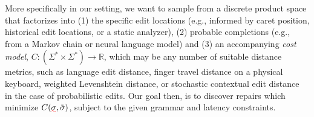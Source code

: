 \documentclass[sigplan,review,anonymous,acmsmall]{acmart}\settopmatter{printfolios=false,printccs=false,printacmref=false}
\begin{document}
%
%

More specifically in our setting, we want to sample from a discrete product space that factorizes into (1) the specific edit locations (e.g., informed by caret position, historical edit locations, or a static analyzer), (2) probable completions (e.g., from a Markov chain or neural language model) and (3) an accompanying \textit{cost model}, $C: (\Sigma^* \times \Sigma^*) \rightarrow \mathbb{R}$, which may be any number of suitable distance metrics, such as language edit distance, finger travel distance on a physical keyboard, weighted Levenshtein distance, or stochastic contextual edit distance~\cite{cotterell+al.acl14} in the case of probabilistic edits. Our goal then, is to discover repairs which minimize $C(\err{\sigma}, \tilde{\sigma})$, subject to the given grammar and latency constraints.

\end{document}
